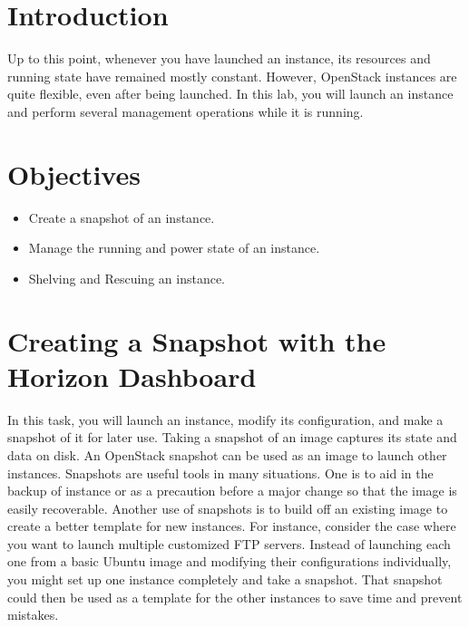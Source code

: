 \documentclass[letterpaper, 12pt]{article}
\begin{document}

\section*{Introduction}\label{sec:introduction}
Up to this point, whenever you have launched an instance, its resources and running state have remained mostly constant.
However, OpenStack instances are quite flexible, even after being launched.
In this lab, you will launch an instance and perform several management operations while it is running.

\section*{Objectives}\label{sec:objectives}
\begin{itemize}[itemsep=0pt]
    \item Create a snapshot of an instance.
    \item Manage the running and power state of an instance.
    \item Shelving and Rescuing an instance.
\end{itemize}
\clearpage

\labsettings

\section{Creating a Snapshot with the Horizon Dashboard}\label{sec:creating-a-snapshot-web}
In this task, you will launch an instance, modify its configuration, and make a snapshot of it for later use.
Taking a snapshot of an image captures its state and data on disk.
An OpenStack snapshot can be used as an image to launch other instances.
Snapshots are useful tools in many situations.
One is to aid in the backup of instance or as a precaution before a major change so that the image is easily recoverable.
Another use of snapshots is to build off an existing image to create a better template for new instances.
For instance, consider the case where you want to launch multiple customized FTP servers.
Instead of launching each one from a basic Ubuntu image and modifying their configurations individually, you might set up one instance completely and take a snapshot.
That snapshot could then be used as a template for the other instances to save time and prevent mistakes.
\end{document}
